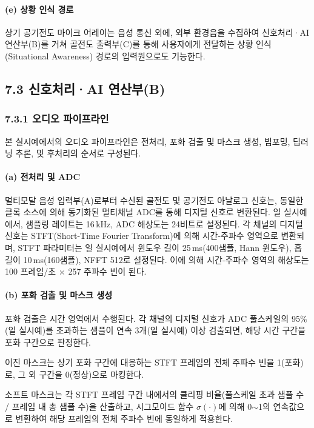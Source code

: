 \documentclass{article}
\begin{document}
\paragraph{(e) 상황 인식 경로}

상기 공기전도 마이크 어레이는 음성 통신 외에, 외부 환경음을 수집하여 신호처리·AI 연산부(B)를 거쳐 골전도 출력부(C)를 통해 사용자에게 전달하는 상황 인식(Situational Awareness) 경로의 입력원으로도 기능한다.

\subsection{7.3 신호처리·AI 연산부(B)}

\subsubsection{7.3.1 오디오 파이프라인}

본 실시예에서의 오디오 파이프라인은 전처리, 포화 검출 및 마스크 생성, 빔포밍, 딥러닝 추론, 및 후처리의 순서로 구성된다.

\paragraph{(a) 전처리 및 ADC}

멀티모달 음성 입력부(A)로부터 수신된 골전도 및 공기전도 아날로그 신호는, 동일한 클록 소스에 의해 동기화된 멀티채널 ADC를 통해 디지털 신호로 변환된다. 일 실시예에서, 샘플링 레이트는 16\,kHz, ADC 해상도는 24비트로 설정된다. 각 채널의 디지털 신호는 STFT(Short-Time Fourier Transform)에 의해 시간-주파수 영역으로 변환되며, STFT 파라미터는 일 실시예에서 윈도우 길이 25\,ms(400샘플, Hann 윈도우), 홉 길이 10\,ms(160샘플), NFFT 512로 설정된다. 이에 의해 시간-주파수 영역의 해상도는 100 프레임/초 $\times$ 257 주파수 빈이 된다.

\paragraph{(b) 포화 검출 및 마스크 생성}

포화 검출은 시간 영역에서 수행된다. 각 채널의 디지털 신호가 ADC 풀스케일의 95\%(일 실시예)를 초과하는 샘플이 연속 3개(일 실시예) 이상 검출되면, 해당 시간 구간을 포화 구간으로 판정한다.

이진 마스크는 상기 포화 구간에 대응하는 STFT 프레임의 전체 주파수 빈을 1(포화)로, 그 외 구간을 0(정상)으로 마킹한다.

소프트 마스크는 각 STFT 프레임 구간 내에서의 클리핑 비율(풀스케일 초과 샘플 수 / 프레임 내 총 샘플 수)을 산출하고, 시그모이드 함수 $\sigma(\cdot)$에 의해 0$\sim$1의 연속값으로 변환하여 해당 프레임의 전체 주파수 빈에 동일하게 적용한다.
\end{document}
